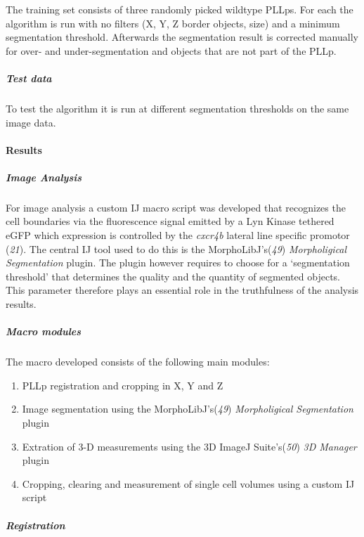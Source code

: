 \documentclass[11pt,singlespacinge,twoside]{reedthesis} %
\providecommand{\tightlist}{%
  \setlength{\itemsep}{0pt}\setlength{\parskip}{0pt}}
\begin{document}
The training set consists of three randomly picked wildtype PLLps. For each the algorithm is run with no filters (X, Y, Z border objects, size) and a minimum segmentation threshold. Afterwards the segmentation result is corrected manually for over- and under-segmentation and objects that are not part of the PLLp.

\hypertarget{test-data-1}{%
\subparagraph{Test data}\label{test-data-1}}

To test the algorithm it is run at different segmentation thresholds on the same image data.

\hypertarget{results-1}{%
\paragraph{Results}\label{results-1}}

\hypertarget{image-analysis-1}{%
\subparagraph{Image Analysis}\label{image-analysis-1}}

For image analysis a custom IJ macro script was developed that recognizes the cell boundaries via the fluorescence signal emitted by a Lyn Kinase tethered eGFP which expression is controlled by the \emph{cxcr4b} lateral line specific promotor (\emph{21}). The central IJ tool used to do this is the MorphoLibJ's(\emph{49}) \emph{Morpholigical Segmentation} plugin. The plugin however requires to choose for a `segmentation threshold' that determines the quality and the quantity of segmented objects. This parameter therefore plays an essential role in the truthfulness of the analysis results.

\hypertarget{macro-modules-1}{%
\subparagraph{Macro modules}\label{macro-modules-1}}

The macro developed consists of the following main modules:
\begin{enumerate}
\def\labelenumi{\arabic{enumi}.}
\tightlist
\item
  PLLp registration and cropping in X, Y and Z
\item
  Image segmentation using the MorphoLibJ's(\emph{49}) \emph{Morpholigical Segmentation} plugin
\item
  Extration of 3-D measurements using the 3D ImageJ Suite's(\emph{50}) \emph{3D Manager} plugin
\item
  Cropping, clearing and measurement of single cell volumes using a custom IJ script
\end{enumerate}
\hypertarget{registration}{%
\subparagraph{Registration}\label{registration}}
\end{document}
